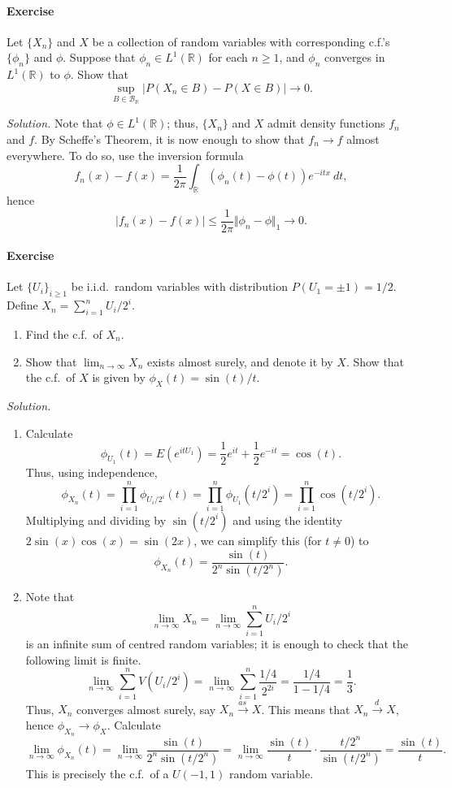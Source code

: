 \documentclass[10pt]{article}
\newcounter{prob}
\newcommand{\problem}{\stepcounter{prob}\paragraph{Exercise \arabic{prob}}}
\newcommand{\solution}{\textit{Solution.} }
\newcommand{\R}{\mathbb{R}}
\newcommand{\toas}{\overset{as\,}{\longrightarrow}}
\newcommand{\tod}{\overset{d\,}{\longrightarrow}}
\begin{document}
    \problem Let $\{X_n\}$ and $X$ be a collection of random variables with
    corresponding c.f.'s $\{\phi_n\}$ and $\phi$. Suppose that $\phi_n \in L^1(\R)$
    for each $n \geq 1$, and $\phi_n$ converges in $L^1(\R)$ to $\phi$. Show that
    \[
        \sup_{B \in \mathcal{B}_\R} |P(X_n \in B) - P(X \in B)| \to 0.
    \]

    \solution Note that $\phi \in L^1(\R)$; thus, $\{X_n\}$ and $X$ admit density
    functions $f_n$ and $f$. By Scheffe's Theorem, it is now enough to show that $f_n
    \to f$ almost everywhere. To do so, use the inversion formula \[
        f_n(x) - f(x) = \frac{1}{2\pi} \int_\R (\phi_n(t) - \phi(t)) e^{-itx} \:dt,
    \] hence \[
        |f_n(x) - f(x)| \leq \frac{1}{2\pi} \Vert \phi_n - \phi\Vert_1 \to 0.
    \]


    \problem Let $\{U_i\}_{i \geq 1}$ be i.i.d.\ random variables with distribution
    $P(U_1 = \pm 1) = 1 / 2$. Define $X_n = \sum_{i = 1}^n U_i / 2^i$.
    \begin{enumerate}
        \item Find the c.f.\ of $X_n$.
        \item Show that $\lim_{n \to \infty} X_n$ exists almost surely, and denote it
        by $X$. Show that the c.f.\ of $X$ is given by $\phi_X(t) = \sin(t)/t$.
    \end{enumerate}

    \solution \begin{enumerate}
        \item Calculate \[
            \phi_{U_1}(t) = E(e^{itU_1}) = \frac{1}{2}e^{it} + \frac{1}{2}e^{-it} =
            \cos(t).
        \] Thus, using independence, \[
            \phi_{X_n}(t) = \prod_{i = 1}^n \phi_{U_i / 2^i}(t) = \prod_{i = 1}^n
            \phi_{U_1}(t / 2^i) = \prod_{i = 1}^n \cos(t / 2^i).
        \] Multiplying and dividing by $\sin(t / 2^i)$ and using the identity
        $2\sin(x)\cos(x) = \sin(2x)$, we can simplify this (for $t \neq 0$) to \[
            \phi_{X_n}(t) = \frac{\sin(t)}{2^n \sin(t / 2^n)}.
        \]

        \item Note that \[
            \lim_{n \to \infty} X_n = \lim_{n \to \infty} \sum_{i = 1}^n
            U_i / 2^i
        \] is an infinite sum of centred random variables; it is enough to check that
        the following limit is finite. \[
            \lim_{n \to \infty} \sum_{i = 1}^n V(U_i / 2^i) = \lim_{n \to \infty}
            \sum_{i = 1}^n \frac{1 / 4}{2^{2i}} = \frac{1 / 4}{1 - 1 / 4} =
            \frac{1}{3}.
        \] Thus, $X_n$ converges almost surely, say $X_n \toas X$. This means that
        $X_n \tod X$, hence $\phi_{X_n} \to \phi_X$. Calculate \[
            \lim_{n \to \infty} \phi_{X_n}(t) = \lim_{n \to \infty}
            \frac{\sin(t)}{2^n \sin(t / 2^n)} = \lim_{n \to \infty}
            \frac{\sin(t)}{t}\cdot \frac{t / 2^n}{\sin(t / 2^n)} = \frac{\sin(t)}{t}.
        \] This is precisely the c.f.\ of a $U(-1, 1)$ random variable.
    \end{enumerate}
\end{document}
